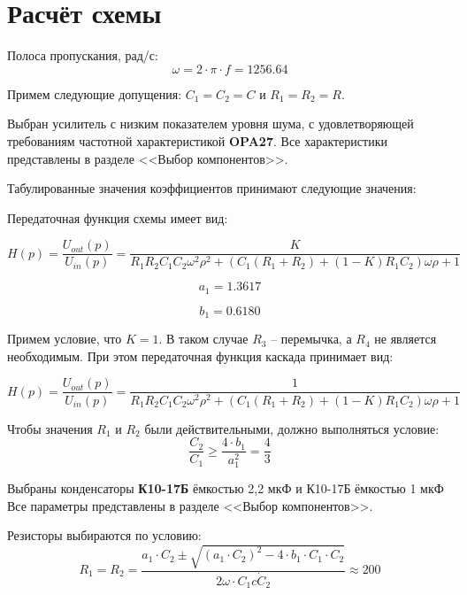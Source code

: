 \chapter{Расчёт схемы}

Полоса пропускания, рад/с:
\[
\omega =2\cdot  \pi \cdot f=1256.64 
\]

Примем следующие допущения: $C_1=C_2=C$ и $R_1=R_2=R$.

Выбран усилитель с низким показателем уровня шума, с удовлетворяющей требованиям частотной характеристикой \textbf{OPA27}. Все характеристики представлены в разделе <<Выбор компонентов>>.


Табулированные значения коэффициентов принимают следующие значения:

Передаточная функция схемы имеет вид:

\[
H(p)=\frac{U_{out} (p)}{U_{in} (p)}=\frac{K}{R_1 R_2 C_1 C_2 \omega^2 \rho^2+(C_1 (R_1+R_2 )+(1-K) R_1 C_2)\omega \rho+1}
\]

\[
a_1=1.3617
\]

\[
b_1=0.6180
\]

Примем условие, что $K=1$. В таком случае $R_3$ – перемычка, а $R_4$ не является необходимым. При этом передаточная функция каскада принимает вид:

\[
H(p)=\frac{U_{out} (p)}{U_{in} (p)}=\frac{1}{R_1 R_2 C_1 C_2 \omega^2 \rho^2+(C_1 (R_1+R_2 )+(1-K) R_1 C_2)\omega \rho+1}
\]

Чтобы значения $R_1$ и $R_2$ были действительными, должно выполняться условие:
\[
\frac{C_2}{C_1} \geq \frac{4\cdot b_1}{a_1^2} = \frac{4}{3}
\]

Выбраны конденсаторы \textbf{К10-17Б} ёмкостью 2,2 мкФ и К10-17Б ёмкостью 1 мкФ Все параметры представлены в разделе <<Выбор компонентов>>.

Резисторы выбираются по условию:
\[
R_1=R_2=\frac{a_1 \cdot C_2 \pm \sqrt{(a_1\cdot C_2)^2-4\cdot b_1 \cdot C_1 \cdot C_2}}{2 \omega \cdot C_1 c\dot C_2} \approx 200
\]
